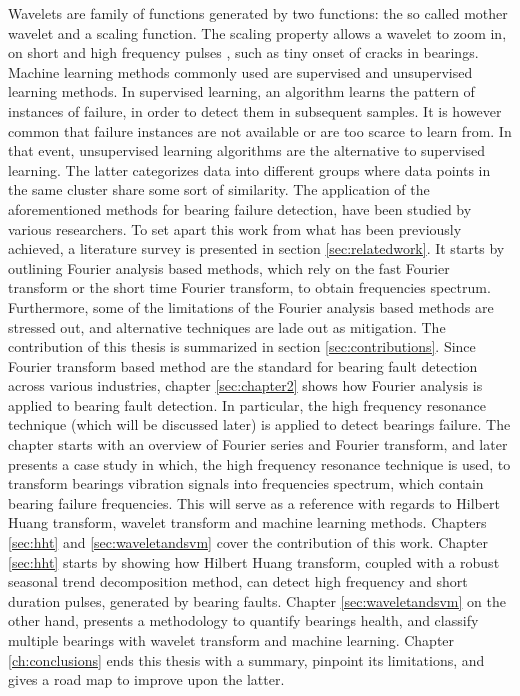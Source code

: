 \documentclass[../Main/thesis.tex]{subfiles}
\begin{document}
Wavelets are family of functions generated by two functions: the so called mother wavelet and a scaling function. The scaling property allows a wavelet to zoom in, on short and high frequency pulses \cite{albert09},
such as tiny onset of cracks in bearings.
\justify
Machine learning methods commonly used are supervised and unsupervised learning methods. In supervised learning, an algorithm learns the pattern of instances of failure, in order to detect them in subsequent samples. It is however common that failure instances are not available or are too scarce to learn from. In that event, unsupervised learning algorithms are the alternative to supervised learning. The latter categorizes data into different groups where data points in the same cluster share some sort of similarity.
\justify
 The application of the aforementioned methods for bearing failure detection, have been studied by various researchers. 
To set apart this work from what has been previously achieved, a literature survey is presented in section \ref{sec:relatedwork}. It starts by outlining Fourier analysis based methods, which rely on the fast Fourier transform or the short time Fourier transform, to obtain frequencies spectrum. Furthermore, some of the limitations of the Fourier analysis based methods are stressed out, and alternative techniques are lade out as mitigation. The contribution of this thesis is summarized in section \ref{sec:contributions}.
\justify
Since Fourier transform based method are the standard for bearing fault detection across various industries, chapter \ref{sec:chapter2} shows how Fourier analysis is applied to bearing fault detection. In particular, the high frequency resonance technique (which will be discussed later) is applied to detect bearings failure. The chapter starts with an overview of Fourier series and Fourier transform, and later presents a case study in which, the high frequency resonance technique is used, to transform bearings vibration signals into frequencies spectrum, which contain bearing failure frequencies.
This will serve as a reference with regards to Hilbert Huang transform, wavelet transform and machine learning methods.
\justify
Chapters \ref{sec:hht} and \ref{sec:waveletandsvm} cover the contribution of this work. Chapter \ref{sec:hht} starts by showing how Hilbert Huang transform, coupled with a robust seasonal trend decomposition method, can detect high frequency and short duration pulses, generated by bearing faults. Chapter \ref{sec:waveletandsvm} on the other hand, presents a methodology to quantify bearings health, and classify multiple bearings with wavelet transform and machine learning. Chapter \ref{ch:conclusions} ends this thesis with a summary, pinpoint its limitations, and gives a road map to improve upon the latter.
\end{document}
